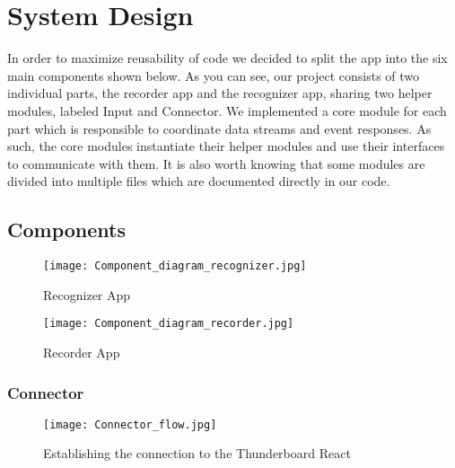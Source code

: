 \chapter{System Design}
\label{ch:SystemDesign}

In order to maximize reusability of code we decided to split the app into the six main components shown below. As you can see, our project consists of two individual parts, the recorder app and the recognizer app, sharing two helper modules, labeled Input and Connector. We implemented a core module for each part which is responsible to coordinate data streams and event responses. As such, the core modules instantiate their helper modules and use their interfaces to communicate with them. It is also worth knowing that some modules are divided into multiple files which are documented directly in our code.

\section{Components}
\label{ch:SystemDesign:sec:Components}

\begin{figure}[htp]
\begin{center}
  \texttt{[image: Component\_diagram\_recognizer.jpg]}
\caption{Recognizer App}
\end{center}
\end{figure} 

\begin{figure}[htp]
\begin{center}
  \texttt{[image: Component\_diagram\_recorder.jpg]}
\caption{Recorder App}
\end{center}
\end{figure} 

\newpage

\subsection{Connector}
\label{ch:SystemDesign:sec:Components:sub:Connector}
\setlength\intextsep{0pt}
\begin{wrapfigure}{R}{0.5\textwidth}
\centering
\texttt{[image: Connector\_flow.jpg]}
\caption{Establishing the connection to the Thunderboard React}\label{fig:flow_chart}
\end{wrapfigure}

